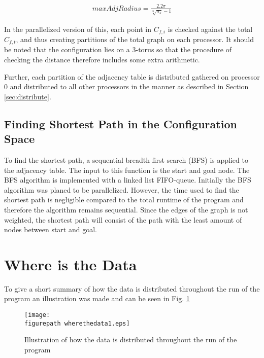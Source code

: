 \begin{align}
\label{eq:}
  maxAdjRadius=\frac{2.2\pi}{\sqrt[3]{n_s}-1}
 \end{align}

 In the parallelized version of this, each point in $C_{f,i}$ is checked against the total $C_{f,t}$, and thus creating partitions of the total graph on each processor. It should be noted that the configuration lies on a 3-torus so that the procedure of checking the distance therefore includes some extra arithmetic. 

Further, each partition of the adjacency table is distributed gathered on processor 0 and distributed to all other processors in the manner as described in Section \ref{sec:distribute}.

\subsection{\textbf{Finding Shortest Path in the Configuration Space}}
To find the shortest path, a sequential breadth first search (BFS) is applied to the adjacency table. The input to this function is the start and goal node. The BFS algorithm is implemented with a linked list FIFO-queue. Initially the BFS algorithm was planed to be parallelized. However, the time used to find the shortest path is negligible compared to the total runtime of the program and therefore the algorithm remains sequential. Since the edges of the graph is not weighted, the shortest path will consist of the path with the least amount of nodes between start and goal.
\pagebreak

\section{\textbf{	Where is the Data}}
To give a short summary of how the data is distributed throughout the run of the program an illustration was made and can be seen in Fig. \ref{fig:wheresthedata}

\begin{figure}[h!] 
 \center 
 \texttt{[image: \\figurepath wherethedata1.eps]}
 \caption{ Illustration of how the data is distributed throughout the run of the program \label{fig:wheresthedata}}
 \end{figure}









